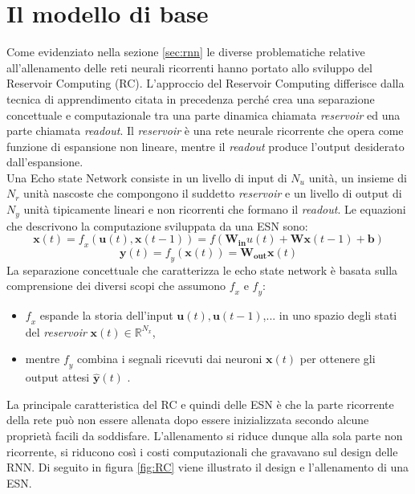 
\section{Il modello di base}
Come evidenziato nella sezione \ref{sec:rnn} le diverse problematiche relative all'allenamento delle reti neurali ricorrenti hanno portato allo sviluppo del Reservoir Computing (RC). L'approccio del Reservoir Computing differisce dalla tecnica di apprendimento citata in precedenza perché crea una separazione concettuale e computazionale tra una parte dinamica chiamata  \textit{reservoir} ed una parte chiamata \textit{readout}. Il \textit{reservoir} è una  rete neurale ricorrente che opera come funzione di espansione non lineare, mentre il \textit{readout} produce l'output desiderato dall'espansione. \\

Una Echo state Network consiste in un livello di input di $N_u$ unità, un insieme di $N_r$ unità nascoste che compongono il suddetto \textit{reservoir} e un livello di output di $N_y$ unità tipicamente lineari e non ricorrenti che formano il \textit{readout}.
Le equazioni che descrivono la computazione sviluppata da una ESN sono:
\begin{equation}\label{attivazioneesn}
\mathbf{x}(\mathit{t})= \mathit{f}_\mathit{x} (\mathbf{u}(\mathit{t}), \mathbf{x}(\mathit{t} - 1)) = f(\mathbf{W_{in}}u(\mathit{t}) + \mathbf{Wx}(\mathit{t - 1} ) + \mathbf{b} )
\end{equation}
\begin{equation}\label{output}
\mathbf{y}(\mathit{t})=\mathit{f_{y}}(\mathbf{x}(\mathit{t}) )= \mathbf{W_{out}}\mathbf{x}(\mathit{t})
\end{equation}
La separazione concettuale che caratterizza le echo state network è basata sulla comprensione dei diversi scopi che assumono $\mathit{f_{x}}$ e $\mathit{f_{y}}$:
\begin{itemize}
	\item $\mathit{f_{x}}$ espande la storia dell'input $\mathbf{u}\mathit{(t)}, \mathbf{u}\mathit{(t-1)}$,... in uno spazio degli stati del \textit{reservoir}  $\mathbf{x}\mathit{(t)} \in \mathds{R}^{N_x}$,
	\item mentre $\mathit{f_{y}}$ combina i segnali ricevuti dai neuroni $\mathbf{x}(\mathit{t})$ per ottenere gli output attesi $\hat{\mathbf{y}}(\mathit{t})$ .\\
\end{itemize}
  
La principale caratteristica del RC e quindi delle ESN è che la parte ricorrente della rete può non essere allenata dopo essere inizializzata secondo alcune proprietà facili da soddisfare. L'allenamento si riduce dunque alla sola parte non ricorrente, si riducono così i costi computazionali che gravavano sul design delle RNN. Di seguito in figura \ref{fig:RC} viene illustrato il design e l'allenamento di una ESN.\\

